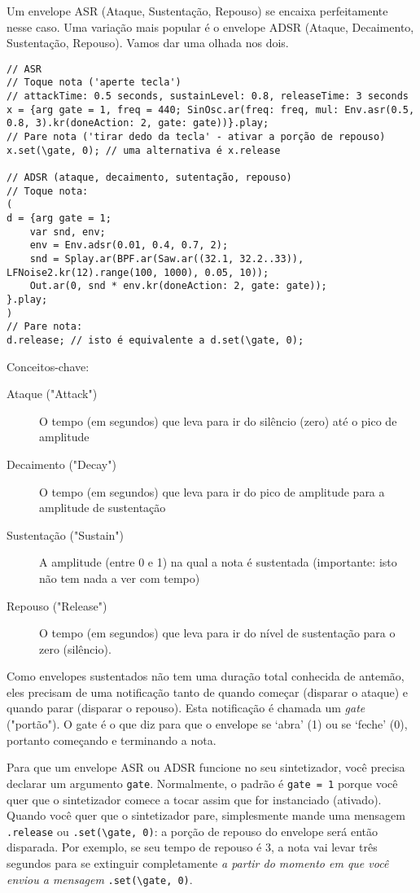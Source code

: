 Um envelope ASR (Ataque, Sustentação, Repouso) se encaixa perfeitamente nesse caso. Uma variação mais popular é o envelope ADSR (Ataque, Decaimento, Sustentação, Repouso). Vamos dar uma olhada nos dois.

 
\begin{lstlisting}[style=SuperCollider-IDE, basicstyle=\scttfamily\footnotesize]
// ASR
// Toque nota ('aperte tecla')
// attackTime: 0.5 seconds, sustainLevel: 0.8, releaseTime: 3 seconds
x = {arg gate = 1, freq = 440; SinOsc.ar(freq: freq, mul: Env.asr(0.5, 0.8, 3).kr(doneAction: 2, gate: gate))}.play;
// Pare nota ('tirar dedo da tecla' - ativar a porção de repouso)
x.set(\gate, 0); // uma alternativa é x.release

// ADSR (ataque, decaimento, sutentação, repouso)
// Toque nota:
(
d = {arg gate = 1;
	var snd, env;
	env = Env.adsr(0.01, 0.4, 0.7, 2);
	snd = Splay.ar(BPF.ar(Saw.ar((32.1, 32.2..33)), LFNoise2.kr(12).range(100, 1000), 0.05, 10));
	Out.ar(0, snd * env.kr(doneAction: 2, gate: gate));
}.play;
)
// Pare nota:
d.release; // isto é equivalente a d.set(\gate, 0);
\end{lstlisting}
 
Conceitos-chave:

\begin{description}
\item[Ataque ("Attack")] O tempo (em segundos) que leva para ir do silêncio (zero) até o pico de amplitude
\item[Decaimento ("Decay")] O tempo (em segundos) que leva para ir do pico de amplitude para a amplitude de sustentação
\item[Sustentação ("Sustain")] A amplitude (entre 0 e 1) na qual a nota é sustentada (importante: isto não tem nada a ver com tempo)
\item[Repouso ("Release")] O tempo (em segundos) que leva para ir do nível de sustentação para o zero (silêncio).
\end{description}

Como envelopes sustentados não tem uma duração total conhecida de antemão, eles precisam de uma notificação tanto de quando começar (disparar o ataque) e quando parar (disparar o repouso). Esta notificação é chamada um \emph{gate} ("portão"). O gate é o que diz para que o envelope se ‘abra’ (1) ou se ‘feche’ (0), portanto começando e terminando a nota.

Para que um envelope ASR ou ADSR funcione no seu sintetizador, você precisa declarar um argumento \texttt{gate}. Normalmente, o padrão é \texttt{gate = 1} porque você quer que o sintetizador comece a tocar assim que for instanciado (ativado). Quando você quer que o sintetizador pare, simplesmente mande uma mensagem \texttt{.release} ou \texttt{.set(\textbackslash gate, 0)}: a porção de repouso do envelope será então disparada. Por exemplo, se seu tempo de repouso é 3, a nota vai levar três segundos para se extinguir completamente \emph{a partir do momento em que você enviou a mensagem} \texttt{.set(\textbackslash gate, 0)}. 

